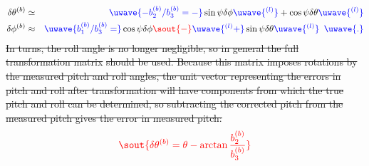 \documentclass[12pt,twoside,english]{article}\usepackage[]{graphicx}\usepackage[]{color}
\providecommand{\DIFadd}[1]{{\protect\color{blue}\uwave{#1}}} %
\providecommand{\DIFdel}[1]{{\protect\color{red}\sout{#1}}}                      %
\providecommand{\DIFaddbegin}{} %
\providecommand{\DIFaddend}{} %
\providecommand{\DIFdelbegin}{} %
\providecommand{\DIFdelend}{} %
\begin{document}
{{\begin{eqnarray}
\delta\theta^{(b)} & \simeq & \DIFaddbegin \DIFadd{-b_{2}^{(b)}/b_{3}^{(b)}=-}\DIFaddend \sin\psi\delta\phi\DIFaddbegin \DIFadd{^{(l)}}\DIFaddend +\cos\psi\delta\theta\DIFaddbegin \DIFadd{^{(l)}}\DIFaddend \label{eq:final-answer}\\
\delta\phi^{(b)} & \approx & \DIFaddbegin \DIFadd{b_{1}^{(b)}/b_{3}^{(b)}=}\DIFaddend \cos\psi\delta\phi\DIFdelbegin \DIFdel{-}\DIFdelend \DIFaddbegin \DIFadd{^{(l)}+}\DIFaddend \sin\psi\delta\theta\DIFaddbegin \DIFadd{^{(l)}}\,\,\,\DIFadd{.}\DIFaddend \nonumber 
\end{eqnarray}
\DIFdelbegin \DIFdel{In turns, the roll angle is no longer negligible, so in general the full transformation matrix }%
\DIFdel{should be used. Because this matrix imposes rotations by the measured pitch and roll angles, the unit vector representing the errors in pitch and roll after transformation will have components from which the true pitch and roll can be determined, so subtracting the corrected pitch from the measured pitch gives the error in measured pitch: }%
\begin{displaymath}\DIFdel{
\delta\theta^{(b)}=\theta-\arctan\frac{b_{2}^{(b)}}{b_{3}^{(b)}}\label{eq:pitch-error-wo-approx} 
}\end{displaymath}
\DIFdelend \DIFaddbegin 

}}
\end{document}
